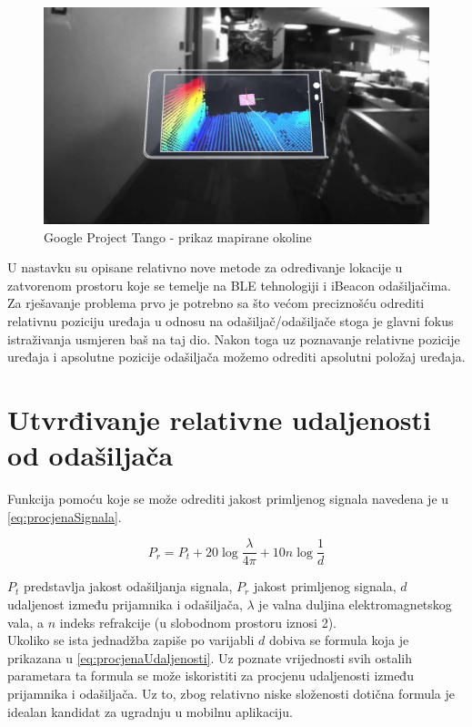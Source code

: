 \begin{figure}[H]
    \centering
    \includegraphics[scale=0.24]{pictures/tango2}
    \caption{Google Project Tango - prikaz mapirane okoline}
\end{figure}

U nastavku su opisane relativno nove metode za određivanje lokacije u zatvorenom prostoru koje se temelje na BLE tehnologiji i iBeacon odašiljačima.
Za rješavanje problema prvo je potrebno sa što većom preciznošću odrediti relativnu poziciju uređaja u odnosu na odašiljač/odašiljače stoga je glavni fokus istraživanja usmjeren baš na taj dio. 
Nakon toga uz poznavanje relativne pozicije uređaja i apsolutne pozicije odašiljača možemo odrediti apsolutni položaj uređaja.

\section*{Utvrđivanje relativne udaljenosti od odašiljača}

Funkcija pomoću koje se može odrediti jakost primljenog signala navedena je u \eqref{eq:procjenaSignala}.

\begin{equation}
	\label{eq:procjenaSignala}
	P_r = P_t + 20\log{\frac{\lambda}{4\pi}} + 10n\log{\frac{1}{d}}
\end{equation}

$P_t$ predstavlja jakost odašiljanja signala, $P_r$ jakost primljenog signala, $d$ udaljenost između prijamnika i odašiljača, $\lambda$ je valna duljina elektromagnetskog vala, a $n$ indeks refrakcije (u slobodnom prostoru iznosi 2).
\\

Ukoliko se ista jednadžba zapiše po varijabli $d$ dobiva se formula koja je prikazana u \eqref{eq:procjenaUdaljenosti}. 
Uz poznate vrijednosti svih ostalih parametara ta formula se može iskoristiti za procjenu udaljenosti između prijamnika i odašiljača.
Uz to, zbog relativno niske složenosti dotična formula je idealan kandidat za ugradnju u mobilnu aplikaciju.

